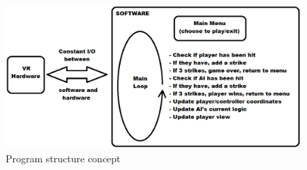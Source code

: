 \documentclass{article}
\begin{document}
\newline

\begin{figure}[1]
\caption{Program structure concept}
\includegraphics[width=\linewidth]{projectPicture.png}
\end{figure}
\end{document}
